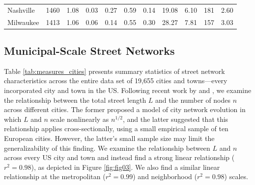 \documentclass[11pt]{article}
\begin{document}
\begin{table}
\begin{tabular}{p{2.5cm} p{1.5cm} p{1.5cm} p{1.5cm} p{1.55cm} p{1.5cm} p{1.5cm} p{1.5cm} p{1.5cm} p{1.5cm} p{1.5cm}}
	Nashville            & 1460          & 1.08         & 0.03                       & 0.27           & 0.59        & 0.14        & 19.08                 & 6.10                  & 181                   & 2.60             \\
	Milwaukee            & 1413          & 1.06         & 0.06                       & 0.14           & 0.55        & 0.30        & 28.27                 & 7.81                  & 157                   & 3.03 \\
	\bottomrule
\end{tabular}
\end{table}

\begin{multicols}{2}



\subsection{Municipal-Scale Street Networks}

Table \ref{tab:measures_cities} presents summary statistics of street network characteristics across the entire data set of 19,655 cities and towns---every incorporated city and town in the US. Following recent work by \citet{barthelemy_modeling_2008} and \citet{strano_urban_2013}, we examine the relationship between the total street length $L$ and the number of nodes $n$ across different cities. The former proposed a model of city network evolution in which $L$ and $n$ scale nonlinearly as $n^{1/2}$, and the latter suggested that this relationship applies cross-sectionally, using a small empirical sample of ten European cities. However, the latter's small sample size may limit the generalizability of this finding. We examine the relationship between $L$ and $n$ across every US city and town and instead find a strong linear relationship ($r^{2}=0.98$), as depicted in Figure \ref{fig:fig03}. We also find a similar linear relationship at the metropolitan ($r^{2}=0.99$) and neighborhood ($r^{2}=0.98$) scales.


\end{multicols}
\end{document}
